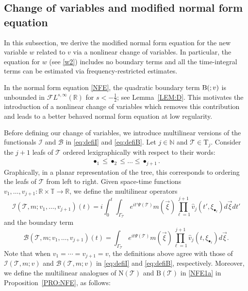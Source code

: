 \documentclass[%
11pt,  reqno]{amsart}
\makeatletter
\newcommand{\5}{\textup{V}}
\newcommand{\FL}{\mathcal{F} L}
\newcommand{\ft}{\widehat}
\theoremstyle{remark}
\newcommand{\R}{\mathbb{R}}
\newcommand{\T}{\mathbb{T}}
\newcommand{\bul}{\bullet}
\newcommand{\TT}{\mathcal{T}}
\newcommand{\Tr}{\mathrm{T}}
\newcommand{\N}{\mathbb{N}}
\def\<#1>{\csname MH@symb@#1\endcsname}
\newcommand{\B}{\mathcal{B}}
\newcommand{\Ical}{\mathcal{I}}
\numberwithin{equation}{section}
\numberwithin{theorem}{section}
\newcommand{\NN}{\mathrm{N}}
\newcommand{\BB}{\mathrm{B}}
\makeatother
\begin{document}
\subsection{Change of variables and modified normal form equation}
\label{SUBSEC:gauge}

In this subsection, we derive the modified normal form equation for the new variable $w$ related to $v$ via a nonlinear change of variables. In particular, the equation for $w$ (see \eqref{w2}) includes no boundary terms and all the time-integral terms can be estimated via frequency-restricted estimates.



In the normal form equation \eqref{NFE}, the quadratic boundary term $\BB(\<1>;v)$ is unbounded in $\FL^{s,\infty}(\R)$ for $s<-\frac12$; see Lemma~\ref{LEM:D}. This motivates the introduction of a nonlinear change of variables which removes this contribution and leads to a better behaved normal form equation at low regularity.

Before defining our change of variables, we introduce multilinear versions of the functionals $\Ical$ and $\B$ in \eqref{eq:defiI} and \eqref{eq:defiB}.
Let $j\in \N$ and $\TT\in \Tr_j$. Consider the $j+1$ leafs of $\TT$ ordered lexigraphically with respect to their words:
\begin{align}
\label{lexic}
\bul_1\le \bul_2\le \dots \le \bul_{j+1}.
\end{align}
Graphically, in a
planar representation of the tree, this corresponds to ordering the leafs of
$\TT$ from left to right. Given space-time functions $v_1,\dots, v_{j+1}: \R \times \T \to \R$, we
define the multilinear operators
\begin{equation}\label{eq:defiImulti}
\Ical(\TT, m; v_1,\dots,v_{j+1}) (t)=i\int_0^t \int_{\Gamma_\TT}
e^{it'\Psi(\TT)}m(\vec{\xi}) \prod_{\ell
=1}^{j+1} \ft v_j(t',\xi_{\bul_\ell}) d\vec{\xi}dt'
\end{equation}
and the boundary term
\begin{equation}\label{eq:defiBmulti}
\B(\TT, m; v_1,\dots,v_{j+1})(t)=\int_{\Gamma_\TT}
e^{it\Psi(\TT)}m(\vec{\xi}) \prod_{\ell
=1}^{j+1} \ft v_j(t,\xi_{\bul_\ell}) d\vec{\xi}.
\end{equation}
Note that
when $v_1 = \cdots = v_{j+1} = v$, the definitions above agree with those of $\Ical(\TT, m; v )$ and $\B(\TT, m; v)$ in \eqref{eq:defiI} and \eqref{eq:defiB}, respectively.  Moreover, we define the multilinear analogues of $\NN(\TT)$ and $\BB(\TT)$ in \eqref{NFE1a} in Proposition~\ref{PRO:NFE}, as follows:
\end{document}

